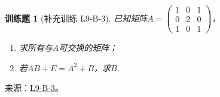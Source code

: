 \documentclass[12pt,fontset=fandol]{ctexart}
\newtheorem{exercise}{训练题}[section]
\begin{document}
\begin{exercise}[补充训练 L9-B-3]\label{prob:L9-B-3}
已知矩阵$A=\begin{pmatrix}
                1 & 0 & 1 \\ 0 & 2 & 0 \\ 1 & 0 & 1
            \end{pmatrix}$，
        \begin{enumerate}
            \item 求所有与$A$可交换的矩阵；

            \item 若$AB+E=A^2+B$，求$B$.
        \end{enumerate}
\end{exercise}
\noindent 来源：\href{https://github.com/yhwu-is/Linear-Algebra-Left-Undone/blob/new/%E8%AE%B2%E4%B9%89/%E4%B8%93%E9%A2%98/9%20%E7%9F%A9%E9%98%B5%E8%BF%90%E7%AE%97%E8%BF%9B%E9%98%B6.tex}{L9-B-3}。
\end{document}
